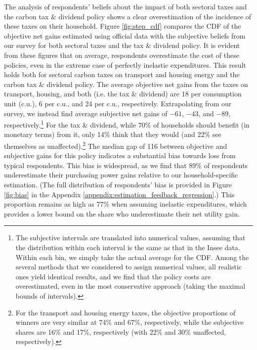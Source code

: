 \documentclass[12pt]{article} %
\begin{document}
The analysis of respondents' beliefs about the impact of both sectoral taxes and the carbon tax \& dividend policy shows a clear overestimation of the incidence of these taxes on their household. Figure \ref{fig:step_cdf} compares the CDF of the objective net gains estimated using official data with the subjective beliefs from our survey for both sectoral taxes and the tax \& dividend policy. It is evident from these figures that on average, respondents overestimate the cost of these policies, even in the extreme case of perfectly inelastic expenditures. This result holds both for sectoral carbon taxes on transport and housing energy and the carbon tax \& dividend policy. The average objective net gains from the taxes on transport, housing, and both (i.e. the tax \& dividend) are 18\euros{} per consumption unit (c.u.), 6\euros{} per c.u., and 24\euros{} per c.u., respectively. Extrapolating from our survey, we instead find average subjective net gains of $-61$\euros{}, $-43$\euros{}, and $-89$\euros{}, respectively.\footnote{The subjective intervals are translated into numerical values, assuming that the distribution within each interval is the same as that in the Insee data. Within each bin, we simply take the actual average for the CDF. Among the several methods that we considered to assign numerical values, all realistic ones yield identical results, and we find that the policy costs are overestimated, even in the most conservative approach (taking the maximal bounds of intervals).} For the tax \& dividend, while 70\% of households should benefit (in monetary terms) from it, only 14\% think that they would (and 22\% see themselves as unaffected).\footnote{For the transport and housing energy taxes, the objective proportions of winners are very similar at 74\% and 67\%, respectively, while the subjective shares are 16\% and 17\%, respectively (with 22\% and 30\% unaffected, respectively).} The median gap of 116\euros{} between objective and subjective gains for this policy indicates a substantial bias towards loss from typical respondents. This bias is widespread, as we find that 89\% of respondents underestimate their purchasing power gains relative to our household-specific estimation. (The full distribution of respondents' bias is provided in Figure \ref{fig:bias} in the Appendix \ref{appendix:estimation_feedback_regression}.) This proportion remains as high as 77\% when assuming inelastic expenditures, which provides a lower bound on the share who underestimate their net utility gain.

\end{document}
